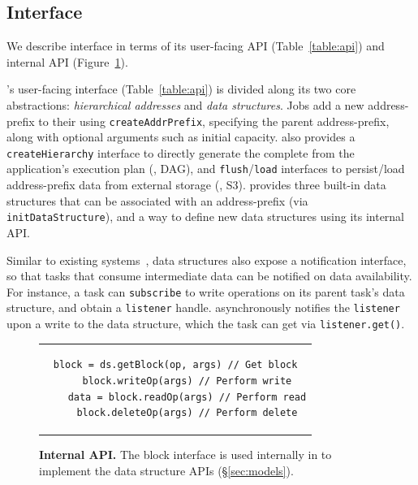 \subsection{\jiffy Interface}
\label{ssec:api}


We describe \jiffy interface in terms of its user-facing API (Table~\ref{table:api}) and internal API (Figure~\ref{fig:blockapi}).

 \jiffy's user-facing interface (Table~\ref{table:api}) is divided along its two core abstractions: \textit{hierarchical addresses} and \textit{data structures}. Jobs add a new address-prefix to their \lh using \texttt{createAddrPrefix}, specifying the parent address-prefix, along with optional arguments such as initial capacity. \jiffy also provides a \texttt{createHierarchy} interface to directly generate the complete \lh from the application's execution plan (\ie, DAG), and \texttt{flush}/\texttt{load} interfaces to persist/load address-prefix data from external storage (\eg, S3). \jiffy provides three built-in data structures that can be associated with an address-prefix (via \texttt{initDataStructure}), and a way to define new data structures using its internal API. %

Similar to existing systems~\cite{redis, sns}, data structures also expose a notification interface, so that tasks that consume intermediate data can be notified on data availability. For instance, a task can \texttt{subscribe} to write operations on its parent task's data structure, and obtain a \texttt{listener} handle. \jiffy asynchronously notifies the \texttt{listener} upon a write to the data structure, which the task can get via \texttt{listener.get()}.

\begin{figure}[h]
  \centering
  \begin{tabular}{c}
  {\begin{lstlisting}[frame=single, gobble=4, linewidth=20em]
    block = ds.getBlock(op, args) // Get block
    block.writeOp(args) // Perform write
    data = block.readOp(args) // Perform read
    block.deleteOp(args) // Perform delete
  \end{lstlisting}}
  \end{tabular}
  \vspace{-0.5em}
  \caption{\textbf{\jiffy Internal API.} The block interface is used internally in \jiffy to implement the data structure APIs (\S\ref{sec:models}).}  
  \label{fig:blockapi}\vspace{-1em}
\end{figure}

